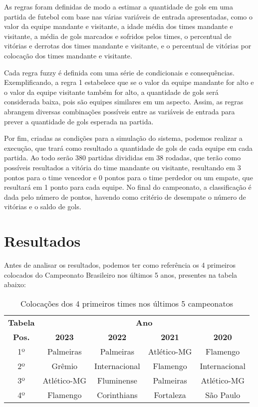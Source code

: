\documentclass[conference]{IEEEtran}
\begin{document}
\indent As regras foram definidas de modo a estimar a quantidade de gols em uma 
partida de futebol com base nas várias variáveis de entrada apresentadas, como 
o valor da equipe mandante e visitante, a idade média dos times mandante e 
visitante, a média de gols marcados e sofridos pelos times, o percentual de 
vitórias e derrotas dos times mandante e visitante, e o percentual de vitórias 
por colocação dos times mandante e visitante.

Cada regra fuzzy é definida com uma série de condicionais e consequências. 
Exemplificando, a regra 1 estabelece que se o valor da equipe mandante for alto 
e o valor da equipe visitante também for alto, a quantidade de gols será 
considerada baixa, pois são equipes similares em um aspecto. Assim, as regras 
abrangem diversas combinações possíveis entre as variáveis de entrada para 
prever a quantidade de gols esperada na partida.

\indent Por fim, criadas as condições para a simulação do sistema, podemos 
realizar a execução, que trará como resultado a quantidade de gols de cada 
equipe em cada partida. Ao todo serão 380 partidas divididas em 38 rodadas, que 
terão como possíveis resultados a vitória do time mandante ou visitante, 
resultando em 3 pontos para o time vencedor e 0 pontos para o time perdedor ou 
um empate, que resultará em 1 ponto para cada equipe. No final do campeonato, a 
classificação é dada pelo número de pontos, havendo como critério de desempate o 
número de vitórias e o saldo de gols.

\section{Resultados}

\indent Antes de analisar os resultados, podemos ter como referência os 4 
primeiros colocados do Campeonato Brasileiro nos últimos 5 anos, presentes na 
tabela abaixo:

\begin{table}[htbp]
    \caption{Colocações dos 4 primeiros times nos últimos 5 campeonatos}
    \begin{center}
        \begin{tabular}{|c|c|c|c|c|}
        \hline
        \textbf{Tabela} & \multicolumn{4}{|c|}{\textbf{Ano}} \\
        \cline{1-5} 
        \textbf{Pos.} & \textbf{2023} & \textbf{2022} & \textbf{2021} & \textbf{2020}\\
        \hline
        1º & Palmeiras & Palmeiras & Atlético-MG & Flamengo\\
        \hline
        2º & Grêmio & Internacional & Flamengo & Internacional\\
        \hline
        3º & Atlético-MG & Fluminense & Palmeiras & Atlético-MG\\
        \hline
        4º & Flamengo & Corinthians & Fortaleza & São Paulo\\
        \hline
    \end{tabular}
    \label{tab1}
    \end{center}
\end{table}
\end{document}
